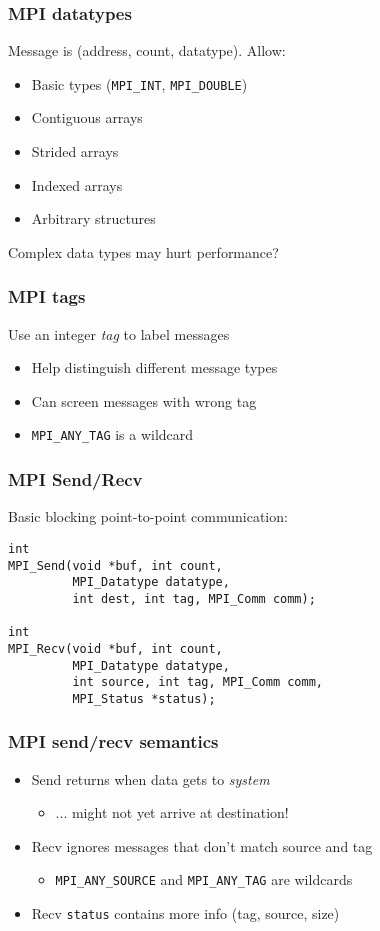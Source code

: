\documentclass{beamer}
\begin{document}
\begin{frame}
  \frametitle{MPI datatypes}
  
  Message is (address, count, datatype).  Allow:
  \begin{itemize}
  \item Basic types ({\tt MPI\_INT}, {\tt MPI\_DOUBLE})
  \item Contiguous arrays
  \item Strided arrays
  \item Indexed arrays
  \item Arbitrary structures
  \end{itemize}
  Complex data types may hurt performance?
\end{frame}


\begin{frame}
  \frametitle{MPI tags}

  Use an integer {\em tag} to label messages
  \begin{itemize}
  \item Help distinguish different message types
  \item Can screen messages with wrong tag
  \item {\tt MPI\_ANY\_TAG} is a wildcard
  \end{itemize}
\end{frame}


\begin{frame}[fragile]
  \frametitle{MPI Send/Recv}

Basic blocking point-to-point communication:
\begin{verbatim}
int 
MPI_Send(void *buf, int count, 
         MPI_Datatype datatype, 
         int dest, int tag, MPI_Comm comm);

int 
MPI_Recv(void *buf, int count,
         MPI_Datatype datatype,
         int source, int tag, MPI_Comm comm, 
         MPI_Status *status);

\end{verbatim}

\end{frame}


\begin{frame}
  \frametitle{MPI send/recv semantics}

  \begin{itemize}
  \item
    Send returns when data gets to {\em system}
    \begin{itemize}
    \item ... might not yet arrive at destination!
    \end{itemize}
  \item
    Recv ignores messages that don't match source and tag
    \begin{itemize}
    \item {\tt MPI\_ANY\_SOURCE} and {\tt MPI\_ANY\_TAG} are wildcards
    \end{itemize}
  \item
    Recv {\tt status} contains more info (tag, source, size)
  \end{itemize}
\end{frame}
\end{document}
